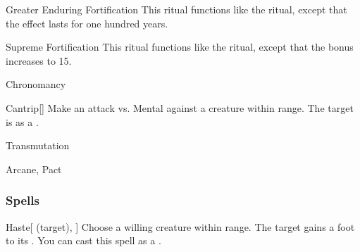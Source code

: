 \lowercase{\hypertarget{spell:Greater Enduring Fortification}{}}\label{spell:Greater Enduring Fortification}
\begin{ability}[\nth{5}]{\hypertarget{spell:Greater Enduring Fortification}{Greater Enduring Fortification}}
This ritual functions like the  ritual, except that the effect lasts for one hundred years.
\end{ability}
\vspace{0.25em}



\lowercase{\hypertarget{spell:Supreme Fortification}{}}\label{spell:Supreme Fortification}
\begin{ability}[\nth{6}]{\hypertarget{spell:Supreme Fortification}{Supreme Fortification}}
This ritual functions like the  ritual, except that the  bonus increases to 15.
\end{ability}
\vspace{0.25em}


\newpage
\begin{spellsection}{Chronomancy}

\begin{spellheader}
\end{spellheader}


\begin{ability}{Cantrip}[]
Make an attack vs. Mental against a creature within \rngmed range.
\hit The target is  as a .
\end{ability}




 Transmutation

 Arcane, Pact
\end{spellsection}


\subsubsection{Spells}


\lowercase{\hypertarget{spell:Haste}{}}\label{spell:Haste}
\begin{ability}[\nth{1}]{\hypertarget{spell:Haste}{Haste}}[ (target), ]
Choose a willing creature within \rngmed range.
The target gains a  foot  to its .
You can cast this spell as a .
\end{ability}
\vspace{0.25em}



